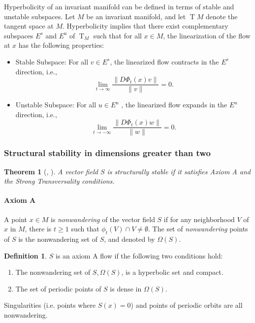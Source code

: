 \documentclass{article}
\newtheorem{theorem}{Theorem}
\theoremstyle{definition} \newtheorem{definition}{Definition}
\theoremstyle{remark} \newtheorem{remark}{Remark}
\newcommand{\T}{\operatorname{T}}
\newcommand{\TM}{\T\!M}
\newcounter{ct}
\begin{document}
Hyperbolicity of an invariant manifold can be defined in terms of stable and unstable subspaces. Let $M$ be an invariant manifold, and let $\TM$  denote the tangent space at $M$. Hyperbolicity implies that there exist complementary subspaces $E^s$  and $E^u$  of $\T_M$  such that for all $x\in M$, the linearization of the flow at $x$ has the following properties:
\begin{itemize}
\item Stable Subspace: For all $v\in E^s$, the linearized flow contracts in the $E^s$  direction, i.e., \[\lim_{t \to \infty} \frac{\|D\Phi_t(x)v\|}{\|v\|} = 0.\]
\item Unstable Subspace: For all $u\in E^u$ , the linearized flow expands in the $E^u$ direction, i.e., \[\lim_{t \to -\infty} \frac{\|D\Phi_t(x)w\|}{\|w\|} = 0.\]
\end{itemize}


\subsubsection{Structural stability in dimensions greater than two}
\begin{theorem}[\cite{robbin1971ss}, \cite{robinson1974ss}]\label{theorem:ss}
A vector field $S$ is structurally stable if it satisfies Axiom A and the Strong Transversality conditions.
\end{theorem}

\paragraph{Axiom A}
A point $x\in M$ is \emph{nonwandering} of the vector field $S$ if for any neighborhood $V$ of $x$ in $M$, there is $t\geq 1$ such that $\phi_t(V) \cap V\neq \emptyset$. The set of \emph{nonwandering} points of $S$ is the nonwandering set of $S$, and denoted by $\Omega(S)$. 

\begin{definition}
$S$ is an axiom A flow if the following two conditions hold:
\begin{enumerate}
\item The nonwandering set of $S, \Omega(S)$, is a hyperbolic set and compact.
\item The set of periodic points of $S$ is dense in $\Omega(S)$.
\end{enumerate}
\end{definition}

Singularities (i.e. points where $S(x)=0$) and points of periodic orbits are all nonwandering.
\end{document}
